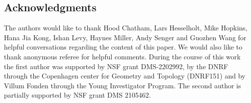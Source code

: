 \subsection*{Acknowledgments}\hfill

The authors would like to thank Hood Chatham, Lars Hesselholt, Mike Hopkins, Hana Jia Kong, Ishan Levy, Haynes Miller, Andy Senger and Guozhen Wang for helpful conversations regarding the content of this paper. We would also like to thank anonymous referee for helpful comments.
During the course of this work the first author was supported by NSF grant DMS-2202992, by the DNRF through the Copenhagen center for Geometry and Topology (DNRF151) and by Villum Fonden through the Young Investigator Program.
The second author is partially supported by NSF grant DMS 2105462.




